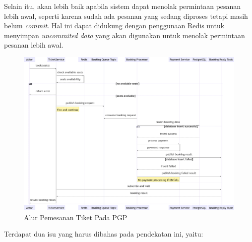 Selain itu, akan lebih baik apabila sistem dapat menolak permintaan pesanan lebih awal, seperti karena sudah ada pesanan yang sedang diproses tetapi masih belum \textit{commit}. Hal ini dapat didukung dengan penggunaan Redis untuk menyimpan \textit{uncommited data} yang akan digunakan untuk menolak permintaan pesanan lebih awal.

\begin{figure}[htbp]
    \centering
    \includegraphics[width=1\textwidth]{resources/appendix/pgp-purchase-flow.png}
    \caption{Alur Pemesanan Tiket Pada PGP}
    \label{fig:pgp-purchase-flow}
\end{figure}

Terdapat dua isu yang harus dibahas pada pendekatan ini, yaitu:

